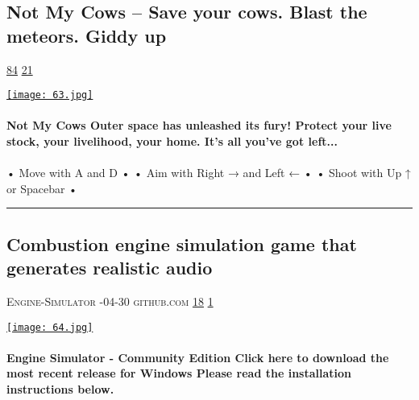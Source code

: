 \documentclass[10pt,a4paper]{article}
\begin{document}
\begin{multicols}{2}
\begin{minipage}{\linewidth}
\subsection{Not My Cows – Save your cows. Blast the meteors. Giddy up}
\textsc{\footnotesize
{\scriptsize\faThumbsOUp}\space 
\href{http://news.ycombinator.com/item?id=37164650\&utm\_term=comment}{84} 
{\scriptsize\faComments}\space 
\href{http://news.ycombinator.com/item?id=37164650\&utm\_term=comment}{21} 
}
\par\medskip\noindent
\href{https://notmycows.com/?utm\_source=hackernewsletter\&utm\_medium=email\&utm\_term=fun}{
    \texttt{[image: 63.jpg]}
}
\end{minipage}
\paragraph{}
\textbf{Not My Cows
Outer space has unleashed its fury! Protect your live stock, your livelihood, your home. It's all you've got left...}
\paragraph{}

• Move with A and D •
• Aim with Right → and Left ← •
• Shoot with Up ↑ or Spacebar •
\par\noindent\textcolor{red}{\rule{\linewidth}{0.2mm}}
\vfill
\null
\noindent\begin{minipage}{\linewidth}
\subsection{Combustion engine simulation game that generates realistic audio}
\textsc{\footnotesize
{\scriptsize\faUser}\space 
Engine-Simulator 
{\scriptsize\faCalendar}-04-30 
{\scriptsize\faGithub}\space 
github.com 
{\scriptsize\faThumbsOUp}\space 
\href{http://news.ycombinator.com/item?id=37173555\&utm\_term=comment}{18} 
{\scriptsize\faComments}\space 
\href{http://news.ycombinator.com/item?id=37173555\&utm\_term=comment}{1} 
}
\par\medskip\noindent
\href{https://github.com/Engine-Simulator/engine-sim-community-edition?utm\_source=hackernewsletter\&utm\_medium=email\&utm\_term=fun}{
    \texttt{[image: 64.jpg]}
}
\end{minipage}
\paragraph{}
\textbf{Engine Simulator - Community Edition
Click here to download the most recent release for Windows
Please read the installation instructions below.}

\end{multicols}
\end{document}
